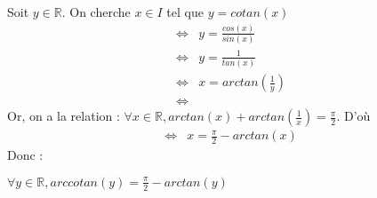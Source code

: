 Soit $y \in \mathbb{R}$. On cherche $x\in I$ tel que $y = cotan(x)$
\[
  \begin{array}{rl}
    \iff & y = \frac{cos(x)}{sin(x)}          \\
    \iff & y  = \frac{1}{tan(x)}              \\
    \iff & x = arctan\left(\frac{1}{y}\right) \\
    \iff &
  \end{array}
\]
Or, on a la relation : $\forall x \in\mathbb{R}, arctan(x)+arctan\left(\frac{1}{x}\right) = \frac{\pi}{2}$. D'où
\[
  \begin{array}{rl}
    \iff & x = \frac{\pi}{2} - arctan(x)
  \end{array}
\]
Donc :
\begin{result}
  $\forall y\in \mathbb{R}, arccotan(y) = \frac{\pi}{2} - arctan(y)$
\end{result}
